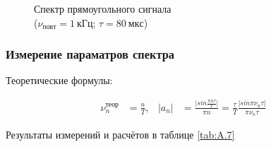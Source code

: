 \documentclass[a4paper, 12pt]{article}
\begin{document}
                \begin{figure}[ht]
                    \begin{minipage}[ht]{0.49\linewidth}
                        \caption{Спектр прямоугольного сигнала\\($\nu_{повт} = 1~кГц$; $\tau = 80~мкс$)}
                        \label{plot:A.6.7}
                    \end{minipage}
                \end{figure}

            \subsubsection{Измерение параматров спектра}

                Теоретические формулы:

                \begin{align*}
                    \nu_n^{теор} &= \frac{n}{T}, & \vert a_n \vert &= \frac{\vert sin\frac{\pi n \tau}{T} \vert}{\pi n} = \frac{\tau}{T} \frac{\vert sin \pi \nu_n \tau \vert}{\pi \nu_n \tau}
                \end{align*}

                Результаты измерений и расчётов в таблице \ref{tab:A.7}
\end{document}
